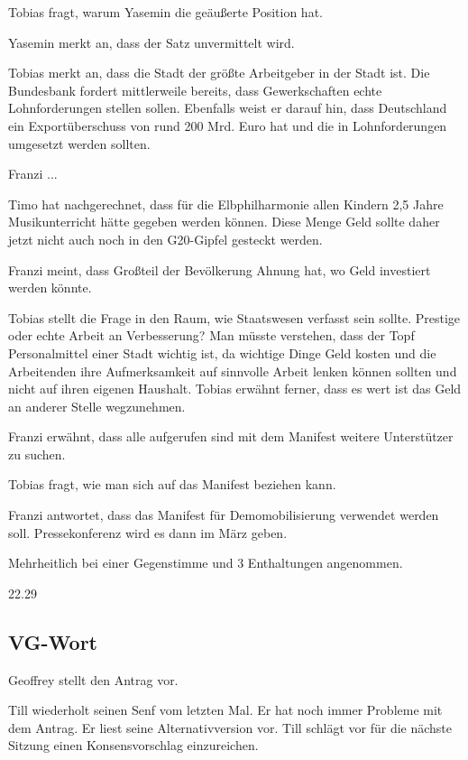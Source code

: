 \documentclass[ngerman,headheight=70pt]{scrartcl}
\begin{document}
    Tobias fragt, warum Yasemin die geäußerte Position hat.

    Yasemin merkt an, dass der Satz unvermittelt wird.

    Tobias merkt an, dass die Stadt der größte Arbeitgeber in der Stadt ist.
    Die Bundesbank fordert mittlerweile bereits, dass Gewerkschaften echte
    Lohnforderungen stellen sollen. Ebenfalls weist er darauf hin, dass Deutschland
    ein Exportüberschuss von rund 200 Mrd. Euro hat und die in Lohnforderungen
    umgesetzt werden sollten.

    Franzi ...

    Timo hat nachgerechnet, dass für die Elbphilharmonie allen Kindern 2,5 Jahre
    Musikunterricht hätte gegeben werden können. Diese Menge Geld sollte daher
    jetzt nicht auch noch in den G20-Gipfel gesteckt werden.

    Franzi meint, dass Großteil der Bevölkerung Ahnung hat, wo Geld investiert
    werden könnte.

    Tobias stellt die Frage in den Raum, wie Staatswesen verfasst sein sollte.
    Prestige oder echte Arbeit an Verbesserung? Man müsste verstehen, dass
    der Topf Personalmittel einer Stadt wichtig ist, da wichtige Dinge Geld
    kosten und die Arbeitenden ihre Aufmerksamkeit auf sinnvolle Arbeit lenken
    können sollten und nicht auf ihren eigenen Haushalt.
    Tobias erwähnt ferner, dass es wert ist das Geld an anderer Stelle wegzunehmen.

    Franzi erwähnt, dass alle aufgerufen sind mit dem Manifest weitere Unterstützer
    zu suchen.

    Tobias fragt, wie man sich auf das Manifest beziehen kann.

    Franzi antwortet, dass das Manifest für Demomobilisierung verwendet werden soll.
    Pressekonferenz wird es dann im März geben.

    Mehrheitlich bei einer Gegenstimme und 3 Enthaltungen angenommen.

    22.29
    \subsection{VG-Wort}

    Geoffrey stellt den Antrag vor.

    Till wiederholt seinen Senf vom letzten Mal. Er hat noch immer Probleme
    mit dem Antrag. Er liest seine Alternativversion vor. Till schlägt vor
    für die nächste Sitzung einen Konsensvorschlag einzureichen.
\end{document}

